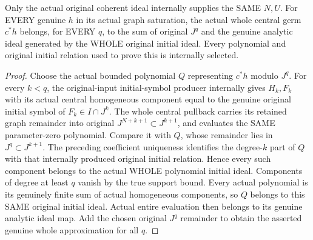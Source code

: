 \begin{theorem}
\label{hir:relative-normal-graph-central-internal-all-jet-ideal-approximation}
\leanok
Only the actual original coherent ideal internally supplies the SAME $N,U$. For EVERY genuine $h$ in its actual graph saturation, the actual whole central germ $c^*h$ belongs, for EVERY $q$, to the sum of original $J^q$ and the genuine analytic ideal generated by the WHOLE original initial ideal. Every polynomial and original initial relation used to prove this is internally selected.
\end{theorem}
\begin{proof}
Choose the actual bounded polynomial $Q$ representing $c^*h$ modulo $J^q$. For every $k<q$, the original-input initial-symbol producer internally gives $H_k,F_k$ with its actual central homogeneous component equal to the genuine original initial symbol of $F_k\in I\cap J^k$. The whole central pullback carries its retained graph remainder into original $J^{N+k+1}\subset J^{k+1}$, and evaluates the SAME parameter-zero polynomial. Compare it with $Q$, whose remainder lies in $J^q\subset J^{k+1}$. The preceding coefficient uniqueness identifies the degree-$k$ part of $Q$ with that internally produced original initial relation. Hence every such component belongs to the actual WHOLE polynomial initial ideal. Components of degree at least $q$ vanish by the true support bound. Every actual polynomial is its genuinely finite sum of actual homogeneous components, so $Q$ belongs to this SAME original initial ideal. Actual entire evaluation then belongs to its genuine analytic ideal map. Add the chosen original $J^q$ remainder to obtain the asserted genuine whole approximation for all $q$.
\end{proof}

